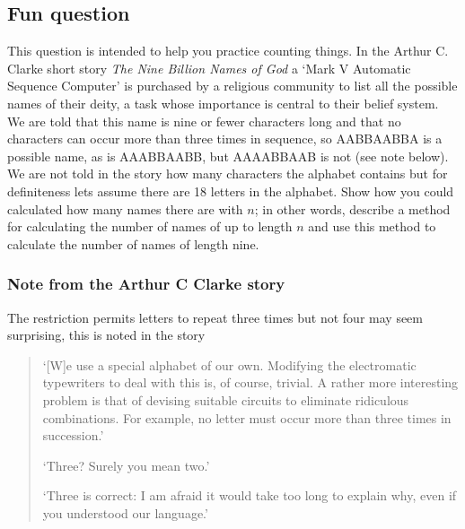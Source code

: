 \documentclass[11pt,a4paper]{scrartcl}
\begin{document}
\subsection*{Fun question}

This question is intended to help you practice counting things. In the
Arthur C. Clarke short story \textsl{The Nine Billion Names of God} a
\lq{}Mark V Automatic Sequence Computer\rq{} is purchased by a
religious community to list all the possible names of their deity, a
task whose importance is central to their belief system. We are told
that this name is nine or fewer characters long and that no characters
can occur more than three times in sequence, so AABBAABBA is a
possible name, as is AAABBAABB, but AAAABBAAB is not (see note
below). We are not told in the story how many characters the alphabet
contains but for definiteness lets assume there are 18 letters in the
alphabet. Show how you could calculated how many names there are with
$n$; in other words, describe a method for calculating the number of
names of up to length $n$ and use this method to calculate the
number of names of length nine.

\subsubsection*{Note from the Arthur C Clarke story}

The restriction permits letters to repeat three times but not four may
seem surprising, this is noted in the story
\begin{quotation}
\lq{}[W]e use a special alphabet of our own. Modifying the
electromatic typewriters to deal with this is, of course, trivial. A
rather more interesting problem is that of devising suitable circuits
to eliminate ridiculous combinations. For example, no letter must
occur more than three times in succession.\rq{}

\lq{}Three? Surely you mean two.\rq{}

\lq{}Three is correct: I am afraid it would take too long to explain why, even if you understood our language.\rq{}
\end{quotation}
\end{document}
